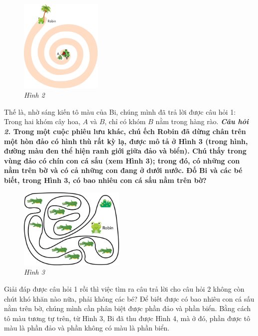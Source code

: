 	\begin{figure}[H]
		\centering
		\captionsetup{labelformat= empty, justification=centering}
		\includegraphics[width=0.35\textwidth]{2}
		\caption{\small\textit{Hình 2}}
		\vspace*{-15pt}
	\end{figure}
 	Thế là, nhờ sáng kiến tô màu của Bi, chúng  mình đã trả lời được câu hỏi 1: Trong hai khóm cây hoa, $A$ và $B$, chỉ có khóm $B$ nằm trong hàng rào.
	\vskip 0.1cm
	\textbf{\textit{Câu hỏi 2.} {\color{abc}Trong một cuộc phiêu lưu khác, chú ếch Robin đã dừng chân trên một hòn đảo có hình thù rất kỳ lạ, được mô tả ở Hình 3 (trong hình, đường màu đen thể hiện ranh giới giữa đảo và biển). Chú thấy trong vùng đảo có chín con cá sấu (xem Hình 3); trong đó, có những con nằm trên bờ và có cả những con đang ở dưới nước. Đố Bi và các bé biết, trong Hình 3, có bao nhiêu con cá sấu nằm trên bờ?}}
	\begin{figure}[H]
		\centering
		\vspace*{-10pt}
		\captionsetup{labelformat= empty, justification=centering}
		\includegraphics[width=0.45\textwidth]{pic12}
		\caption{\small\textit{Hình 3}}
		\vspace*{-10pt}
	\end{figure}
	Giải đáp được câu hỏi 1 rồi thì việc tìm ra câu trả lời cho câu hỏi 2 không còn chút khó khăn nào nữa, phải không các bé?
	\vskip 0.1cm
	Để biết được có bao nhiêu con cá sấu nằm trên bờ, chúng mình cần phân biệt được phần đảo và phần biển. Bằng cách tô màu tương tự trên, từ Hình 3, Bi đã thu được Hình 4, mà ở đó, phần được tô màu là phần đảo và phần không có màu là phần biển.
